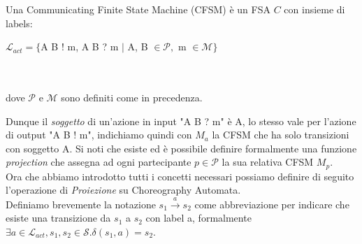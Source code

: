 \begin{definition}
    \label{def:CommunicatingFiniteStateMachine}
    Una Communicating Finite State Machine (CFSM) è un FSA $C$ con insieme di labels: \bigskip \\
    \centerline{$\mathcal{L}_{act} = \{$A B ! m, A B ? m $|$ A, B $ \in \mathcal{P},$ m $ \in \mathcal{M}\}$}
    \\ \\
    dove $\mathcal{P}$ e $\mathcal{M}$ sono definiti come in precedenza.
\end{definition}
Dunque il \emph{soggetto} di un'azione in input "A B ? m" è A, lo stesso vale per l'azione di output "A B ! m", indichiamo quindi con $M_a$ la CFSM che ha solo transizioni con soggetto A. Si noti che esiste ed è possibile definire formalmente una funzione \emph{projection} che assegna ad ogni partecipante $p \in \mathcal{P}$ la sua relativa CFSM $M_p$.\\
Ora che abbiamo introdotto tutti i concetti necessari possiamo definire di seguito l'operazione di \emph{Proiezione} su Choreography Automata. \\
Definiamo brevemente la notazione $s_1 \xrightarrow{a} s_{2}$ come abbreviazione per indicare che esiste una transizione da $s_1$ a $s_2$ con label a, formalmente $\exists a \in \mathcal{L}_{act}, s_1, s_2 \in \mathcal{S}. \delta(s_1, a) = s_2$.

